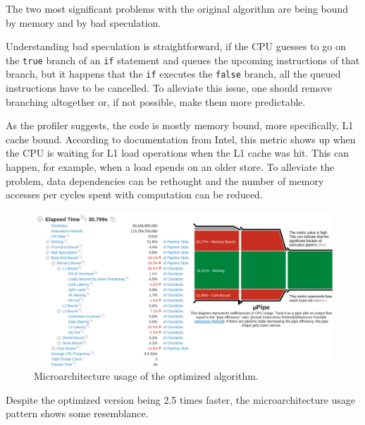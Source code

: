 \documentclass[12pt]{article}
\newcommand{\code}[1]{\texttt{#1}}
\begin{document}
The two most significant problems with the original algorithm are being bound by memory and by bad speculation.

Understanding bad speculation is straightforward, if the CPU guesses to go on the \code{true} branch of an \code{if} statement and queues the upcoming instructions of that branch, but it happens that the \code{if} executes the \code{false} branch, all the queued instructions have to be cancelled.\cite{intel_vtune_docs} To alleviate this issue, one should remove branching altogether or, if not possible, make them more predictable.

As the profiler suggests, the code is mostly memory bound, more specifically, L1 cache bound. According to documentation from Intel, this metric shows up when the CPU is waiting for L1 load operations when the L1 cache was hit. This can happen, for example, when a load epends on an older store. To alleviate the problem, data dependencies can be rethought and the number of memory accesses per cycles spent with computation can be reduced.\cite{intel_vtune_docs}

\begin{figure}[H]
	\begin{center}
		\includegraphics[width=\textwidth]{velout_uarch_overall_opt}
	\end{center}
	\caption{Microarchitecture usage of the optimized algorithm.}
	\label{fig_velout_uarch_overall_opt}
\end{figure}

Despite the optimized version being 2.5 times faster, the microarchitecture usage pattern shows some resemblance.
\end{document}
